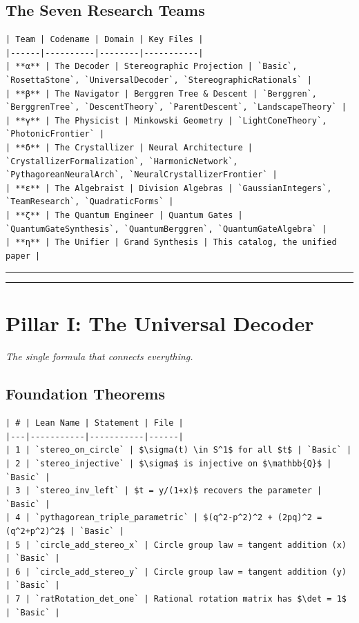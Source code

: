 \documentclass[12pt,a4paper,openany]{book}
\begin{document}
\subsection{The Seven Research Teams}

\begin{verbatim}
| Team | Codename | Domain | Key Files |
|------|----------|--------|-----------|
| **α** | The Decoder | Stereographic Projection | `Basic`, `RosettaStone`, `UniversalDecoder`, `StereographicRationals` |
| **β** | The Navigator | Berggren Tree & Descent | `Berggren`, `BerggrenTree`, `DescentTheory`, `ParentDescent`, `LandscapeTheory` |
| **γ** | The Physicist | Minkowski Geometry | `LightConeTheory`, `PhotonicFrontier` |
| **δ** | The Crystallizer | Neural Architecture | `CrystallizerFormalization`, `HarmonicNetwork`, `PythagoreanNeuralArch`, `NeuralCrystallizerFrontier` |
| **ε** | The Algebraist | Division Algebras | `GaussianIntegers`, `TeamResearch`, `QuadraticForms` |
| **ζ** | The Quantum Engineer | Quantum Gates | `QuantumGateSynthesis`, `QuantumBerggren`, `QuantumGateAlgebra` |
| **η** | The Unifier | Grand Synthesis | This catalog, the unified paper |
\end{verbatim}

\bigskip\hrule\bigskip


\bigskip\hrule\bigskip

\section{Pillar I: The Universal Decoder}

\textit{The single formula that connects everything.}

\subsection{Foundation Theorems}

\begin{verbatim}
| # | Lean Name | Statement | File |
|---|-----------|-----------|------|
| 1 | `stereo_on_circle` | $\sigma(t) \in S^1$ for all $t$ | `Basic` |
| 2 | `stereo_injective` | $\sigma$ is injective on $\mathbb{Q}$ | `Basic` |
| 3 | `stereo_inv_left` | $t = y/(1+x)$ recovers the parameter | `Basic` |
| 4 | `pythagorean_triple_parametric` | $(q^2-p^2)^2 + (2pq)^2 = (q^2+p^2)^2$ | `Basic` |
| 5 | `circle_add_stereo_x` | Circle group law = tangent addition (x) | `Basic` |
| 6 | `circle_add_stereo_y` | Circle group law = tangent addition (y) | `Basic` |
| 7 | `ratRotation_det_one` | Rational rotation matrix has $\det = 1$ | `Basic` |
\end{verbatim}
\end{document}
